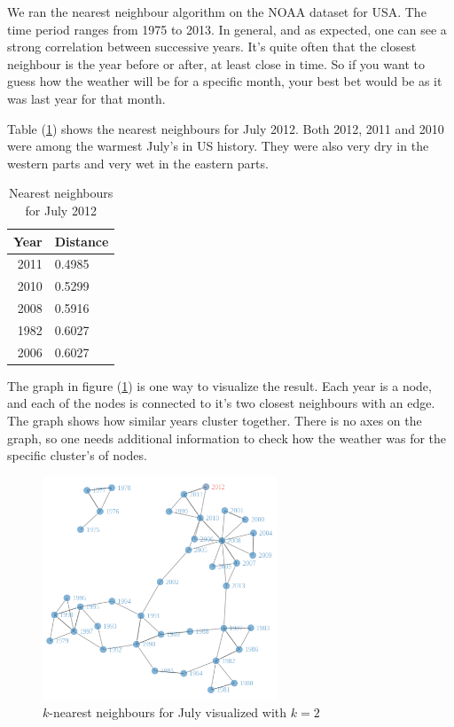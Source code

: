 We ran the nearest neighbour algorithm on the NOAA dataset for USA. The time period
ranges from 1975 to 2013. In general, and as expected, one can see a strong correlation 
between successive years. It's quite often that the closest neighbour is the year before
or after, at least close in time. So if you want to guess how the weather will be for a
specific month, your best bet would be as it was last year for that month. 

Table (\ref{tab:NN_jul2012}) shows the nearest neighbours for July 2012. Both 2012, 2011 and
2010 were among the warmest July's in US history. They were also very dry in the western parts and
very wet in the eastern parts. 

\begin{table}[ht]
\centering
\caption{Nearest neighbours for July 2012}
\label{tab:NN_jul2012}
\vspace{0.5cm}
\begin{tabular}{rl}
  \hline
  Year & Distance \\ 
  \hline
  2011 & 0.4985 \\ 
  2010 & 0.5299 \\ 
  2008 & 0.5916 \\ 
  1982 & 0.6027 \\ 
  2006 & 0.6027 \\ 
  \hline
\end{tabular}
\end{table}

The graph in figure (\ref{fig:NNgraph}) is one way to visualize the result. Each year is a node, and each
of the nodes is connected to it's two closest neighbours with an edge. The graph shows
how similar years cluster together. There is no axes on the graph, so one needs additional
information to check how the weather was for the specific cluster's of nodes. 

\begin{figure}[tb]
 	\begin{center}
 		\includegraphics[width=7cm]{figures/NNgraph.png}
 	\end{center}
 	\caption{$k$-nearest neighbours for July visualized with $k = 2$}
 	\label{fig:NNgraph}
 \end{figure} 

